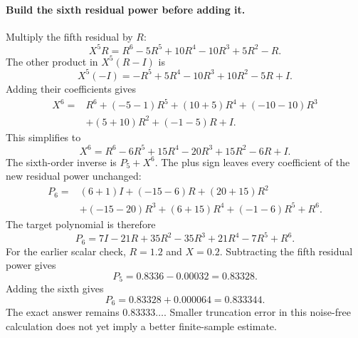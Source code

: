 \documentclass[11pt]{article}
\begin{document}
\paragraph{Build the sixth residual power before adding it.}
Multiply the fifth residual by $R$:
\begin{equation}
 X^5R=R^6-5R^5+10R^4-10R^3+5R^2-R.
\end{equation}
The other product in $X^5(R-I)$ is
\begin{equation}
 X^5(-I)=-R^5+5R^4-10R^3+10R^2-5R+I.
\end{equation}
Adding their coefficients gives
\begin{equation}
 \begin{split}
 X^6={}&R^6+(-5-1)R^5+(10+5)R^4+(-10-10)R^3\\
       &+(5+10)R^2+(-1-5)R+I.
 \end{split}
\end{equation}
This simplifies to
\begin{equation}
 X^6=R^6-6R^5+15R^4-20R^3+15R^2-6R+I.
\end{equation}
The sixth-order inverse is $P_5+X^6$. The plus sign leaves every
coefficient of the new residual power unchanged:
\begin{equation}
 \begin{split}
 P_6={}&(6+1)I+(-15-6)R+(20+15)R^2\\
       &+(-15-20)R^3+(6+15)R^4+(-1-6)R^5+R^6.
 \end{split}
\end{equation}
The target polynomial is therefore
\begin{equation}
 P_6=7I-21R+35R^2-35R^3+21R^4-7R^5+R^6.
 \label{eq:sixth-target}
\end{equation}
For the earlier scalar check, $R=1.2$ and $X=0.2$. Subtracting the fifth
residual power gives
\begin{equation}
 P_5=0.8336-0.00032=0.83328.
\end{equation}
Adding the sixth gives
\begin{equation}
 P_6=0.83328+0.000064=0.833344.
\end{equation}
The exact answer remains $0.83333\ldots$. Smaller truncation error in this
noise-free calculation does not yet imply a better finite-sample estimate.
\end{document}
